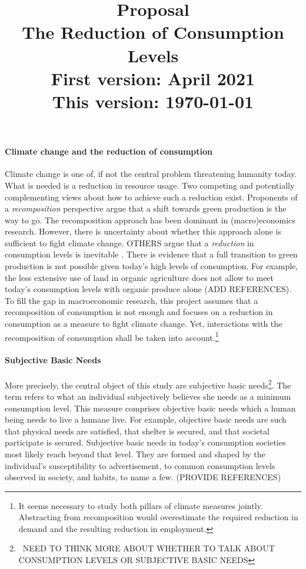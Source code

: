 \documentclass[12pt]{article}
\title{Proposal \\ The Reduction of Consumption Levels\\ \vspace{5mm} \small{First version: April 2021\\ This version: \today}}
\date{}
\begin{document}
	\maketitle

\paragraph{Climate change and the reduction of consumption}
Climate change is one of, if not the central problem threatening humanity today. 
What is needed is a reduction in resource usage. Two competing and potentially complementing views about how to achieve such a reduction exist. 
Proponents of a \textit{recomposition} perspective argue that a shift towards green production is the way to go. 
The recomposition approach has been dominant in (macro)economics research. However, there is uncertainty about whether this approach alone is sufficient to fight climate change.
OTHERS argue  that a \textit{reduction} in consumption levels is inevitable \citep[compare][]{Gough2015ClimateNeeds}. 
There is evidence that a full transition to green production is not possible given today's high levels of consumption. 
For example, the less extensive use of land in organic agriculture does not allow to meet today's consumption levels with organic produce alone (ADD REFERENCES). 
To fill the gap in macroeconomic research,  this project assumes that a recomposition of consumption is not enough and focuses on a reduction in consumption as a measure to fight climate change. Yet, interactions with the recomposition of consumption shall be taken into account.\footnote{It seems necessary to study both pillars of climate measures jointly. Abstracting from recomposition would overestimate the required reduction in demand and the resulting reduction in employment.}


\paragraph{Subjective Basic Needs}
 More precisely, the central object of this study are subjective basic needs\footnote{\ NEED TO THINK MORE ABOUT WHETHER TO TALK ABOUT CONSUMPTION LEVELS OR SUBJECTIVE BASIC NEEDS}. The term refers to what an individual subjectively believes she needs as a minimum consumption level. This measure comprises objective basic needs which a human being needs to live a humane live. 
 For example, objective basic needs are such that physical needs are satisfied, that shelter is secured, and that societal participate is secured. 
Subjective basic needs in today's consumption societies most likely reach beyond that level. They are formed and shaped by the individual's susceptibility to advertisement, to common consumption levels observed in society, and habits, to name a few. (PROVIDE REFERENCES)
\end{document}
